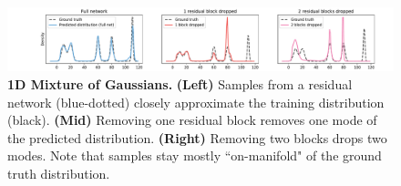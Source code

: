 \label{sec:methods}
\begin{figure}[t]
    \centering
    \includegraphics[width=\linewidth,trim={2.6cm 0 1.8cm 0},clip]{paper_images/mog.pdf}
    \caption{{\bf 1D Mixture of Gaussians.} {\bf (Left)} Samples from a residual network (blue-dotted) closely approximate the training distribution (black). {\bf (Mid)} Removing one residual block removes one mode of the predicted distribution. {\bf (Right)} Removing two blocks drops two modes. Note that samples stay mostly ``on-manifold" of the ground truth distribution.
    }\label{fig:onedexperiment}
\end{figure}



